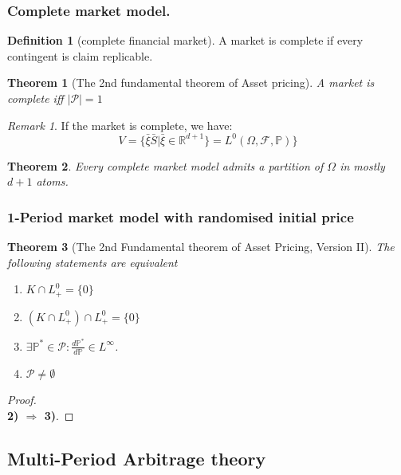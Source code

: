 \documentclass[a4paper,11pt]{book}
\newtheorem{theorem}{Theorem}[section]
\theoremstyle{definition}
\newtheorem{definition}{Definition}[section]
\theoremstyle{remark}
\newtheorem*{remark}{Remark}
\begin{document}
\subsubsection{Complete market model.}

\begin{definition}[complete financial market]
A market is complete if every contingent is claim replicable. 
\end{definition}

\begin{theorem}[The 2nd fundamental theorem of Asset pricing]
	A market is complete iff $|\mathcal{P}| = 1$
\end{theorem}
\begin{remark}
If the market is complete, we have:
\begin{equation*}
	V = \{\bar{\xi}\bar{S}|\bar{\xi} \in \mathbb{R}^{d+1}\} = L^0(\Omega, \mathcal{F}, \mathbb{P})\}
\end{equation*}	
\end{remark}

\begin{theorem}
	Every complete market model admits a partition of $\Omega$ in mostly $d+1$ atoms.
\end{theorem}


\subsubsection{1-Period market model with randomised initial price}
\begin{theorem}[The 2nd Fundamental theorem of Asset Pricing, Version II]
The following statements are equivalent
\begin{enumerate}
	\item $K \cap L^0_+ = \{0\}$
	\item $(K \cap L^0_+) \cap L_+^0 = \{0\}$
	\item $\exists \mathbb{P}^* \in \mathcal{P}: \frac{d\mathbb{P}^*}{d\mathbb{P}} \in L^\infty$. 
	\item $\mathcal{P} \neq \emptyset$
\end{enumerate}
\end{theorem}
\begin{proof}
\quad\\
\textbf{2) $\Rightarrow$ 3)}.
\end{proof}


\subsection{Multi-Period Arbitrage theory}
\end{document}
